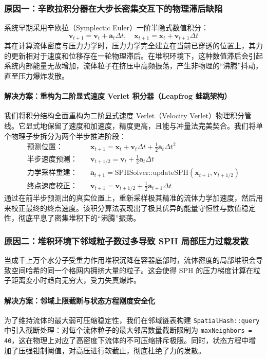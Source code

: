 \documentclass[11pt,a4paper]{article}
\begin{document}
\subsubsection{原因一：辛欧拉积分器在大步长密集交互下的物理滞后缺陷}
系统早期采用辛欧拉（Symplectic Euler）一阶半隐式数值积分：
\begin{equation}
\mathbf{v}_{t+1} = \mathbf{v}_t + \mathbf{a}_t \Delta t, \quad \mathbf{x}_{t+1} = \mathbf{x}_t + \mathbf{v}_{t+1} \Delta t
\end{equation}
其在计算流体密度与压力力学时，压力力学完全建立在当前已穿透的位置上，其力的更新相对于速度和位移存在一轮物理滞后。在堆积环境下，这种数值滞后会引起系统内部能量无故增加，流体粒子在挤压中高频振荡，产生非物理的“沸腾”抖动，直至压力爆炸发散。

\paragraph{解决方案：重构为二阶显式速度 Verlet 积分器（Leapfrog 蛙跳架构）}
我们将积分结构全面重构为二阶显式速度 Verlet（Velocity Verlet）物理积分管线。它显式地保留了速度和加速度，精度更高，且能与冲量法完美契合。我们将单个物理子步拆分为两个半步推进阶段：
\begin{align}
\text{预测位置：} \quad & \mathbf{x}_{t+1} = \mathbf{x}_t + \mathbf{v}_t \Delta t + \frac{1}{2} \mathbf{a}_t \Delta t^2 \\
\text{半步速度预测：} \quad & \mathbf{v}_{t+1/2} = \mathbf{v}_t + \frac{1}{2} \mathbf{a}_t \Delta t \\
\text{力学采样重建：} \quad & \mathbf{a}_{t+1} = \text{SPHSolver::updateSPH}(\mathbf{x}_{t+1}, \mathbf{v}_{t+1/2}) \\
\text{终点速度校正：} \quad & \mathbf{v}_{t+1} = \mathbf{v}_{t+1/2} + \frac{1}{2} \mathbf{a}_{t+1} \Delta t
\end{align}
通过在前半步预测出的真实位置上，重新采样极其精准的流体力学加速度，然后用来校正最终的终点速度。该积分算法表现出了极其优异的能量守恒性与数值稳定性，彻底平息了密集堆积下的“沸腾”振荡。

\subsubsection{原因二：堆积环境下邻域粒子数过多导致 SPH 局部压力过载发散}
当成千上万个水分子受重力作用堆积沉降在容器底部时，流体密度的局部堆积会导致空间哈希的同一个格网内拥挤大量的粒子。这会使得 SPH 的压力梯度计算在粒子距离变小时趋向无穷大，受力失真爆炸。

\paragraph{解决方案：邻域上限截断与状态方程刚度安全化}
为了维持流体的最大弱可压缩稳定性，我们在邻域链表构建 \texttt{SpatialHash::query} 中引入截断处理：对每个流体粒子的最大邻居数量截断限制为 \texttt{maxNeighbors = 40}，这在物理上对应了高密度下流体的不可压缩排斥极限。同时，状态方程中增加了压强钳制阈值，对高压进行软截止，彻底杜绝了力的发散。
\end{document}
